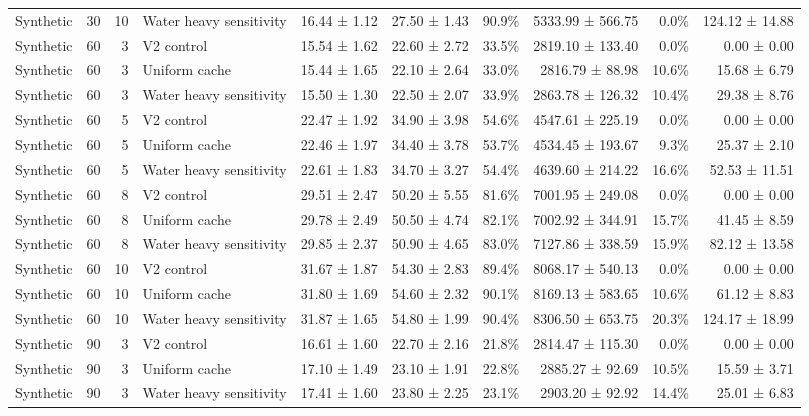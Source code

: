 \documentclass[10pt,a4paper]{article}
\begin{document}
\begin{landscape}
\begin{longtable}{@{}llrlrrrrrr@{}}
Synthetic & 30 & 10 & Water heavy sensitivity & 16.44 ± 1.12 & 27.50 ± 1.43 & 90.9\% & 5333.99 ± 566.75 & 0.0\% & 124.12 ± 14.88 \\
Synthetic & 60 & 3 & V2 control & 15.54 ± 1.62 & 22.60 ± 2.72 & 33.5\% & 2819.10 ± 133.40 & 0.0\% & 0.00 ± 0.00 \\
Synthetic & 60 & 3 & Uniform cache & 15.44 ± 1.65 & 22.10 ± 2.64 & 33.0\% & 2816.79 ± 88.98 & 10.6\% & 15.68 ± 6.79 \\
Synthetic & 60 & 3 & Water heavy sensitivity & 15.50 ± 1.30 & 22.50 ± 2.07 & 33.9\% & 2863.78 ± 126.32 & 10.4\% & 29.38 ± 8.76 \\
Synthetic & 60 & 5 & V2 control & 22.47 ± 1.92 & 34.90 ± 3.98 & 54.6\% & 4547.61 ± 225.19 & 0.0\% & 0.00 ± 0.00 \\
Synthetic & 60 & 5 & Uniform cache & 22.46 ± 1.97 & 34.40 ± 3.78 & 53.7\% & 4534.45 ± 193.67 & 9.3\% & 25.37 ± 2.10 \\
Synthetic & 60 & 5 & Water heavy sensitivity & 22.61 ± 1.83 & 34.70 ± 3.27 & 54.4\% & 4639.60 ± 214.22 & 16.6\% & 52.53 ± 11.51 \\
Synthetic & 60 & 8 & V2 control & 29.51 ± 2.47 & 50.20 ± 5.55 & 81.6\% & 7001.95 ± 249.08 & 0.0\% & 0.00 ± 0.00 \\
Synthetic & 60 & 8 & Uniform cache & 29.78 ± 2.49 & 50.50 ± 4.74 & 82.1\% & 7002.92 ± 344.91 & 15.7\% & 41.45 ± 8.59 \\
Synthetic & 60 & 8 & Water heavy sensitivity & 29.85 ± 2.37 & 50.90 ± 4.65 & 83.0\% & 7127.86 ± 338.59 & 15.9\% & 82.12 ± 13.58 \\
Synthetic & 60 & 10 & V2 control & 31.67 ± 1.87 & 54.30 ± 2.83 & 89.4\% & 8068.17 ± 540.13 & 0.0\% & 0.00 ± 0.00 \\
Synthetic & 60 & 10 & Uniform cache & 31.80 ± 1.69 & 54.60 ± 2.32 & 90.1\% & 8169.13 ± 583.65 & 10.6\% & 61.12 ± 8.83 \\
Synthetic & 60 & 10 & Water heavy sensitivity & 31.87 ± 1.65 & 54.80 ± 1.99 & 90.4\% & 8306.50 ± 653.75 & 20.3\% & 124.17 ± 18.99 \\
Synthetic & 90 & 3 & V2 control & 16.61 ± 1.60 & 22.70 ± 2.16 & 21.8\% & 2814.47 ± 115.30 & 0.0\% & 0.00 ± 0.00 \\
Synthetic & 90 & 3 & Uniform cache & 17.10 ± 1.49 & 23.10 ± 1.91 & 22.8\% & 2885.27 ± 92.69 & 10.5\% & 15.59 ± 3.71 \\
Synthetic & 90 & 3 & Water heavy sensitivity & 17.41 ± 1.60 & 23.80 ± 2.25 & 23.1\% & 2903.20 ± 92.92 & 14.4\% & 25.01 ± 6.83 \\

\end{longtable}
\end{landscape}
\end{document}
